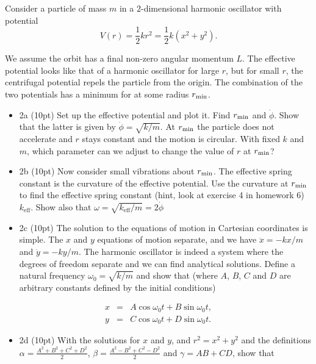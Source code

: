 \documentclass[%
oneside,                 %
final,                   %
10pt]{article}
\begin{document}
Consider a particle of mass $m$ in a $2$-dimensional harmonic oscillator with potential
\[
V(r)=\frac{1}{2}kr^2=\frac{1}{2}k(x^2+y^2).
\]

We assume the orbit has a final non-zero angular momentum $L$.  The
effective potential looks like that of a harmonic oscillator for large
$r$, but for small $r$, the centrifugal potential repels the particle
from the origin. The combination of the two potentials has a minimum
for at some radius $r_{\rm min}$.


\begin{itemize}
\item 2a (10pt) Set up the effective potential and plot it. Find $r_{\rm min}$ and $\dot{\phi}$. Show that the latter is given by $\dot{\phi}=\sqrt{k/m}$.  At $r_{\rm min}$ the particle does not accelerate and $r$ stays constant and the motion is circular. With fixed $k$ and $m$, which parameter can we adjust to change the value of $r$ at $r_{\rm min}$?

\item 2b (10pt) Now consider small vibrations about $r_{\rm min}$. The effective spring constant is the curvature of the effective potential.  Use the curvature at $r_{\rm min}$ to find the effective spring constant (hint, look at  exercise 4 in homework 6) $k_{\mathrm{eff}}$. Show also that $\omega=\sqrt{k_{\mathrm{eff}}/m}=2\dot{\phi}$  

\item 2c (10pt) The solution to the equations of motion in Cartesian coordinates is simple. The $x$ and $y$ equations of motion separate, and we have $\ddot{x}=-kx/m$ and $\ddot{y}=-ky/m$. The harmonic oscillator is indeed a system where the degrees of freedom separate and we can find analytical solutions. Define a natural frequency $\omega_0=\sqrt{k/m}$ and show that (where $A$, $B$, $C$ and $D$ are arbitrary constants defined by the initial conditions)
\end{itemize}

\noindent
\begin{eqnarray*}
x&=&A\cos\omega_0 t+B\sin\omega_0 t,\\
y&=&C\cos\omega_0 t+D\sin\omega_0 t.
\end{eqnarray*}

\begin{itemize}
\item 2d (10pt) With the solutions for $x$ and $y$, and $r^2=x^2+y^2$ and the definitions $\alpha=\frac{A^2+B^2+C^2+D^2}{2}$, $\beta=\frac{A^2-B^2+C^2-D^2}{2}$ and $\gamma=AB+CD$, show that
\end{itemize}
\end{document}
